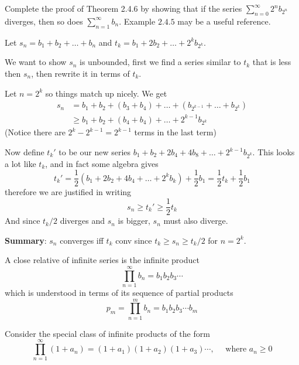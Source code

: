 \begin{exercise}
  Complete the proof of Theorem 2.4.6 by showing that if the series $\sum_{n=0}^{\infty} 2^{n} b_{2^{n}}$ diverges, then so does $\sum_{n=1}^{\infty} b_{n}$. Example $2.4 .5$ may be a useful reference.
\end{exercise}

\begin{solution}
  Let $s_n = b_1 + b_2 + \dots + b_n$ and $t_k = b_1 + 2b_2 + \dots + 2^kb_{2^k}$.

  We want to show $s_n$ is unbounded, first we find a series similar to $t_k$ that is less then $s_n$, then rewrite it in terms of $t_k$.

  Let $n = 2^k$ so things match up nicely. We get
  $$
  \begin{aligned}
  s_n
  &=   b_1 + b_2 + (b_3 + b_4) + \dots + (b_{2^{k-1}} + \dots + b_{2^k}) \\
  &\ge b_1 + b_2 + (b_4 + b_4) + \dots + 2^{k-1}b_{2^k}
  \end{aligned}
  $$
  (Notice there are $2^k - 2^{k-1} = 2^{k-1}$ terms in the last term)

  Now define $t_k'$ to be our new series $b_1 + b_2 + 2b_4 + 4b_8 + \dots + 2^{k-1}b_{2^k}$.
  This looks a lot like $t_k$, and in fact some algebra gives
  $$
  t_k'
  = \frac 12 \left(b_1 + 2b_2 + 4b_4 + \dots + 2^kb_k\right) + \frac 12 b_1
  = \frac 12 t_k + \frac 12 b_1
  $$
  therefore we are justified in writing
  $$
  s_n \ge t_k' \ge \frac 12 t_k
  $$
  And since $t_k/2$ diverges and $s_n$ is bigger, $s_n$ must also diverge.

  \textbf{Summary}: $s_n$ converges iff $t_k$ conv since $t_k \ge s_n \ge t_k/2$ for $n = 2^k$.
\end{solution}

\begin{exercise}
  A close relative of infinite series is the infinite product
  $$
  \prod_{n=1}^{\infty} b_{n}=b_{1} b_{2} b_{3} \cdots
  $$
  which is understood in terms of its sequence of partial products
  $$
  p_{m}=\prod_{n=1}^{m} b_{n}=b_{1} b_{2} b_{3} \cdots b_{m}
  $$

  Consider the special class of infinite products of the form
  $$
  \prod_{n=1}^{\infty}\left(1+a_{n}\right)=\left(1+a_{1}\right)\left(1+a_{2}\right)\left(1+a_{3}\right) \cdots, \quad \text { where } a_{n} \geq 0
  $$
\end{exercise}

